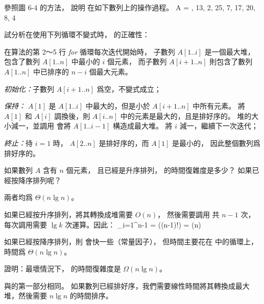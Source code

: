 \startsection[
  title={The heapsort algorithm},
]

\startEXERCISE
參照圖 6-4 的方法，
說明  在如下數列上的操作過程。
\startformula
A = , 13, 2, 25, 7, 17, 20, 8, 4 \rangle
\stopformula
\stopEXERCISE

\startANSWER
\startcombination[4*3]
{\externalfigure[e6_4_1-1]}{}
{\externalfigure[e6_4_1-2]}{}
{\externalfigure[e6_4_1-3]}{}
{\externalfigure[e6_4_1-4]}{}
{\externalfigure[e6_4_1-5]}{}
{\externalfigure[e6_4_1-6]}{}
{\externalfigure[e6_4_1-7]}{}
{\externalfigure[e6_4_1-8]}{}
{\externalfigure[e6_4_1-9]}{}
\stopcombination
\stopANSWER

\startEXERCISE
試分析在使用下列循環不變式時，  的正確性：

在算法的第 2～5 行 \emph{for} 循環每次迭代開始時，
子數列 $A[1..i]$ 是一個最大堆，包含了數列 $A[1..n]$ 中最小的 $i$ 個元素，
而子數列 $A[i+1..n]$ 則包含了數列 $A[1..n]$ 中已排序的 $n-i$ 個最大元素。
\stopEXERCISE

\startANSWER
\emph{初始化：}子數列 $A[i+1..n]$ 爲空，不變式成立；

\emph{保持：} $A[1]$ 是 $A[1..i]$ 中最大的，但是小於 $A[i+1..n]$ 中所有元素。
將 $A[1]$ 和 $A[i]$ 調換後，則 $A[i..n]$ 中的元素是最大的，且是排好序的。
堆的大小減一，並調用  會將 $A[1..i-1]$ 構造成最大堆。
將 $i$ 減一，繼續下一次迭代；

\emph{終止：}待 $i=1$ 時， $A[2..n]$ 是排好序的，而 $A[1]$ 是最小的，
因此整個數列爲排好序的。
\stopANSWER

如果數列 $A$ 含有 $n$ 個元素，
且已經是升序排列，  的時間復雜度是多少？
如果已經按降序排列呢？
\stopEXERCISE

\startANSWER
兩者均爲 $\Theta(n\lg{n})$。

如果已經按升序排列，將其轉換成堆需要 $O(n)$，
然後需要調用  共 $n-1$ 次，
每次調用需要 $\lg{k}$ 次運算。因此：
\startformula
\sum_{i=1}^{n-1} = \lg((n-1)!) = \Theta(n)
\stopformula

如果已經按降序排列，則  會快一些（常量因子），
但時間主要花在  中的循環上，時間爲 $\Theta(n\lg{n})$。
\stopANSWER

\startEXERCISE
證明：最壞情況下，  的時間復雜度是 $\Omega(n\lg{n})$。
\stopEXERCISE

\startANSWER
與的第一部分相同。
如果數列已經排好序，我們需要線性時間將其轉換成最大堆，然後需要 $n\lg{n}$ 的時間排序。
\stopANSWER

